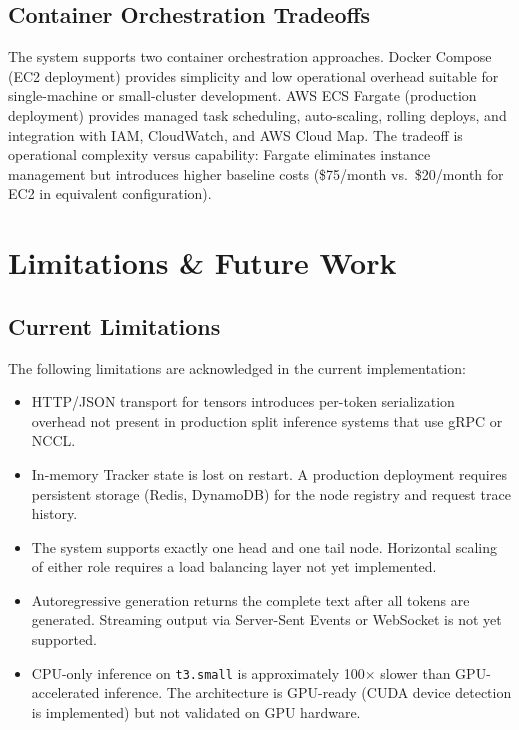 \documentclass[conference]{IEEEtran}
\begin{document}
\subsection{Container Orchestration Tradeoffs}

The system supports two container orchestration approaches. Docker Compose (EC2
deployment) provides simplicity and low operational overhead suitable for
single-machine or small-cluster development. AWS ECS Fargate (production
deployment) provides managed task scheduling, auto-scaling, rolling deploys,
and integration with IAM, CloudWatch, and AWS Cloud Map. The tradeoff is
operational complexity versus capability: Fargate eliminates instance management
but introduces higher baseline costs (\$75/month vs.\ \$20/month for EC2 in
equivalent configuration).

\section{Limitations \& Future Work}

\subsection{Current Limitations}

The following limitations are acknowledged in the current implementation:

\begin{itemize}
  \item HTTP/JSON transport for tensors introduces per-token serialization
        overhead not present in production split inference systems that use
        gRPC or NCCL.
  \item In-memory Tracker state is lost on restart. A production deployment
        requires persistent storage (Redis, DynamoDB) for the node registry
        and request trace history.
  \item The system supports exactly one head and one tail node. Horizontal
        scaling of either role requires a load balancing layer not yet
        implemented.
  \item Autoregressive generation returns the complete text after all tokens
        are generated. Streaming output via Server-Sent Events or WebSocket
        is not yet supported.
  \item CPU-only inference on \texttt{t3.small} is approximately 100$\times$
        slower than GPU-accelerated inference. The architecture is GPU-ready
        (CUDA device detection is implemented) but not validated on GPU
        hardware.
\end{itemize}
\end{document}
